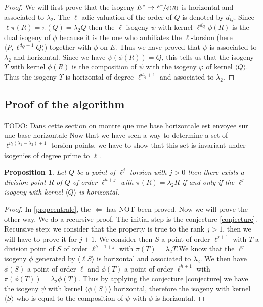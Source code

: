 \documentclass{article}
\newcommand{\todo}[1]{{\color{red}TODO: #1}}
\theoremstyle{plain}
\newtheorem{prop}[thm]{Proposition}
\theoremstyle{definition}
\theoremstyle{remark}
\begin{document}
\begin{proof}
We will first prove that the isogeny $E^* \rightarrow \nicefrac{E^*}{\phi(R)}$ is horizontal and associated to $\lambda_2$.
\newline
The $\ell$ adic valuation of the order of $Q$ is denoted by $d_Q$. Since $\ell \pi(R)=\pi(Q)=\lambda_2Q$ then the $\ell$-isogeny $\psi$ with kernel $\ell^{d_Q}\phi(R)$ is the dual isogeny of $\phi$ because it is the one who anhiliates the $\ell$-torsion (here $\langle P, \ell^{d_Q-1}Q \rangle$) together with $\phi$ on $E$. Thus we have proved that $\psi$ is associated to $\lambda_2$ and horizontal. 
\newline
Since we have $\psi(\phi(R))=Q$, this tells us that the isogeny $\Upsilon$ with kernel $\phi(R)$ is the composition of $\psi$ with the isogeny $\varphi$ of kernel $\langle Q \rangle$. Thus the isogeny $\Upsilon$ is horizontal of degree $\ell^{d_Q+1}$ and associated to $\lambda_2$. 
\end{proof}


\subsection{Proof of the algorithm}
\todo{Dans cette section on montre que une base horizontale est envoyee sur une base horizontale}
Now that we have seen a way to determine a set of $\ell^{\nu_{\ell}(\lambda_1-\lambda_2)+1}$ torsion points, we have to show that this set is invariant under isogenies of degree prime to $\ell$.

\begin{prop}
Let $Q$ be a point of $\ell^j$ torsion with $j>0$ then there exists a division point $R$ of $Q$ of order $\ell^{h+j}$ with $\pi(R)=\lambda_2R$ if and only if the $\ell^j$ isogeny with kernel $\langle Q \rangle $ is horizontal.
\end{prop}

\begin{proof}
In \ref{propcentrale}, the $\Leftarrow$ has NOT been proved. Now we will prove the other way.
\newline
We do a recursive proof. The initial step is the conjecture \ref{conjecture}.
\newline
Recursive step: we consider that the property is true to the rank $j>1$, then we will have to prove it for $j+1$.
We consider then $S$ a point of order $\ell^{j+1}$ with $T$ a division point of $S$ of order $\ell^{h+1+j}$ with $\pi(T)=\lambda_2T$.We know that the $\ell^j$ isogeny $\phi$ generated by $\langle \ell S \rangle$ is horizontal and associated to $\lambda_2$. We then have $\phi(S)$ a point of order $\ell$ and $\phi(T)$ a point of order $\ell^{h+1}$ with $\pi(\phi(T))=\lambda_2\phi(T)$. Thus by applying the conjecture \ref{conjecture} we have the isogeny $\psi$ with kernel $\langle \phi(S) \rangle$ horizontal, therefore the isogeny with kernel $\langle S \rangle$ who is equal to the composition of $\psi$ with $\phi$ is horizontal.
\end{proof}
\end{document}
